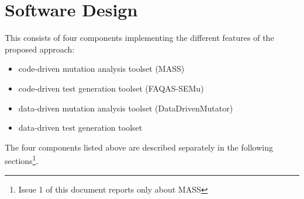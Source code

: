 
\chapter{Software Design}

This \FAQAS consists of four components implementing the different features of the proposed approach:
\begin{itemize}
	\item code-driven mutation analysis toolset (MASS)
	\item code-driven test generation toolset (FAQAS-SEMu)
	\item data-driven mutation analysis toolset (DataDrivenMutator)
	\item data-driven test generation toolset
\end{itemize}

The four components listed above are described separately in the following sections\footnote{Issue 1 of this document reports only about MASS}.


